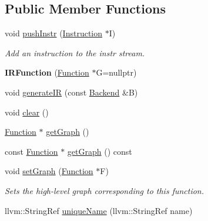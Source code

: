 \subsection*{Public Member Functions}
\begin{DoxyCompactItemize}
\item 
\mbox{\label{classglow_1_1_i_r_function_a25843b2f4343991c633482ff6e5f9836}} 
void \hyperlink{classglow_1_1_i_r_function_a25843b2f4343991c633482ff6e5f9836}{push\+Instr} (\hyperlink{classglow_1_1_instruction}{Instruction} $\ast$I)
\begin{DoxyCompactList}\small\item\em Add an instruction to the instr stream. \end{DoxyCompactList}\item 
\mbox{\label{classglow_1_1_i_r_function_a39dd25d665ed7ccca20b8ed7617f97af}} 
{\bfseries I\+R\+Function} (\hyperlink{classglow_1_1_function}{Function} $\ast$G=nullptr)
\item 
void \hyperlink{classglow_1_1_i_r_function_ad4e28beb9ad08629d4f9f479dfd2b993}{generate\+IR} (const \hyperlink{classglow_1_1_backend}{Backend} \&B)
\item 
void \hyperlink{classglow_1_1_i_r_function_ae55c9c317c085a417b8e814fed07d16e}{clear} ()
\item 
\hyperlink{classglow_1_1_function}{Function} $\ast$ \hyperlink{classglow_1_1_i_r_function_aa92aac0064e63f593b6f6f1c43c1cec7}{get\+Graph} ()
\item 
const \hyperlink{classglow_1_1_function}{Function} $\ast$ \hyperlink{classglow_1_1_i_r_function_ad86f50fe3418ea5acd411afeda573dae}{get\+Graph} () const
\item 
\mbox{\label{classglow_1_1_i_r_function_ab3259845f867bb7ec7552bd6efc42d31}} 
void \hyperlink{classglow_1_1_i_r_function_ab3259845f867bb7ec7552bd6efc42d31}{set\+Graph} (\hyperlink{classglow_1_1_function}{Function} $\ast$F)
\begin{DoxyCompactList}\small\item\em Sets the high-\/level graph corresponding to this function. \end{DoxyCompactList}\item 
llvm\+::\+String\+Ref \hyperlink{classglow_1_1_i_r_function_abab74f68d9282d91dd7fbe004e5b1abc}{unique\+Name} (llvm\+::\+String\+Ref name)

\end{DoxyCompactItemize}

